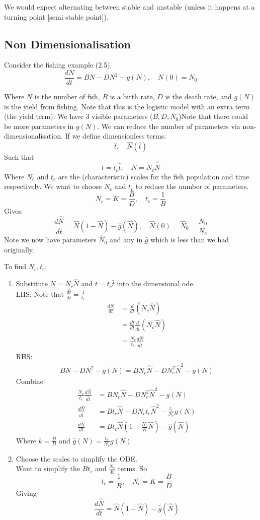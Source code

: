 \documentclass{X:/Documents/Coding/Latex/myassignment}
\begin{document}
We would expect alternating between stable and unstable (unless it happens at a turning point [semi-stable point]).



\subsection{Non Dimensionalisation}
Consider the fishing example (2.5).
\[\frac{dN}{dt} = BN - DN^2 - g(N), \quad N(0) = N_0\]

Where $N$ is the number of fish, $B$ is a birth rate, $D$ is the death rate, and $g(N)$ is the yield from fishing. Note that this is the logistic model with an extra term (the yield term). We have 3 visible parameters ($B,D,N_0$)Note that there could be more parameters in $g(N)$.
We can reduce the number of parameters via non-dimensionalisation.
If we define dimensionless terms:
\[ \hat{t}, \quad \hat{N}(\hat{t}) \]
Such that
\[t = t_c \hat{t}, \quad N = N_c \hat{N}\]
Where $N_c$ and $t_c$ are the (characteristic) scales for the fish population and time respectively.
We want to choose $N_c$ and $t_c$ to reduce the number of parameters.
\[N_c = K = \frac{B}{D}, \quad t_c = \frac1B\]
Gives:
\[\frac{d\hat{N}}{d\hat{t}} = \hat{N}(1-\hat{N}) - \hat{g}(\hat{N}), \quad \hat{N}(0) = \hat{N}_0 = \frac{N_0}{N_c}\]
Note we now have parameters $\hat{N}_0$ and any in $\hat{g}$ which is less than we had originally.

To find $N_c,t_c$:
\begin{enumerate}
    \item Substitute $N=N_c\hat{N}$ and $t=t_c\hat{t}$ into the dimensional ode.\\
    LHS:
    Note that $\frac{d\hat{t}}{dt} = \frac1{t_c}$
    \begin{align*}
        \frac{dN}{dt} &= \frac{d}{dt}( N_c\hat{N})\\
        &= \frac{d\hat{t}}{dt} \frac{d}{d\hat{t}} (N_c\hat{N})\\
        &= \frac{N_c}{t_c} \frac{d\hat{N}}{d\hat{t}}\\
    \end{align*}
    RHS:
    \begin{align*}
        BN - DN^2 - g(N) = B N_c \hat{N} - D N_c^2 \hat{N}^2 - g(N)
    \end{align*}
    Combine
    \begin{align*}
        \frac{N_c}{t_c} \frac{d\hat{N}}{d\hat{t}}&=  B N_c \hat{N} - D N_c^2 \hat{N}^2 - g(N)\\
        \frac{d\hat{N}}{d\hat{t}}&=  Bt_c\hat{N} - D N_c t_c \hat{N}^2 - \frac{t_c}{N_c}g(N)\\
        \frac{d\hat{N}}{dt} &= B t_c \hat{N} (1 - \frac{N_c}{K} \hat{N}) - \hat{g}(\hat{N})
    \end{align*}
    Where $k=\frac{B}{D}$ and $\hat{g}(N) = \frac{t_c}{N_c} g(N)$
    \item Choose the scales to simplify the ODE.\\
    Want to simplify the $Bt_c$ and $\frac{N_c}{K}$ terms.
    So 
    \[t_c = \frac1B,\quad N_c = K = \frac{B}{D}\]
    Giving
    \[\frac{d\hat{N}}{dt} = \hat{N} (1-\hat{N}) - \hat{g}(\hat{N}) \]
\end{enumerate}
\end{document}
